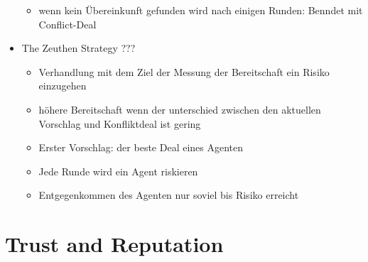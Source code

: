 \documentclass{article} %
\begin{document}
\begin{itemize}
\begin{itemize}
			\item wenn kein Übereinkunft gefunden wird nach einigen Runden: Benndet mit Conflict-Deal
		\end{itemize}
		\item The Zeuthen Strategy ???
		\begin{itemize}
			\item Verhandlung mit dem Ziel der Messung der Bereitschaft ein Risiko einzugehen
			\item höhere Bereitschaft wenn der unterschied zwischen den aktuellen Vorschlag und Konfliktdeal ist gering
			\item Erster Vorschlag: der beste Deal eines Agenten
			\item Jede Runde wird ein Agent riskieren
			\item Entgegenkommen des Agenten nur soviel bis Risiko erreicht 
		\end{itemize}
	\end{itemize}
	\section{Trust and Reputation}
\end{document}
